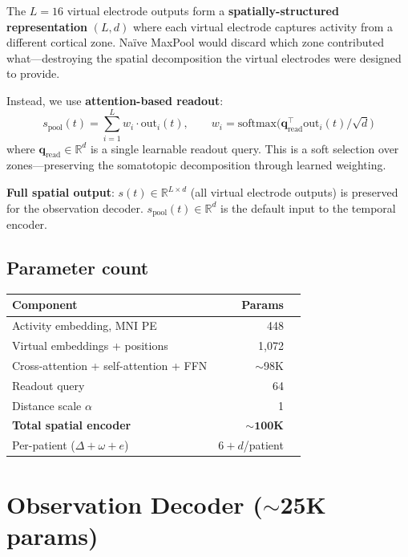 \documentclass[11pt,letterpaper]{article}
\newcommand{\R}{\mathbb{R}}
\begin{document}
The $L = 16$ virtual electrode outputs form a \textbf{spatially-structured representation} $(L, d)$ where each virtual electrode captures activity from a different cortical zone. Na\"ive MaxPool would discard which zone contributed what---destroying the spatial decomposition the virtual electrodes were designed to provide.

Instead, we use \textbf{attention-based readout}:
\begin{equation}
s_{\text{pool}}(t) = \sum_{i=1}^{L} w_i \cdot \text{out}_i(t), \qquad w_i = \text{softmax}\bigl(\mathbf{q}_{\text{read}}^\top \text{out}_i(t) / \sqrt{d}\bigr)
\end{equation}
where $\mathbf{q}_{\text{read}} \in \R^d$ is a single learnable readout query. This is a soft selection over zones---preserving the somatotopic decomposition through learned weighting.

\textbf{Full spatial output}: $s(t) \in \R^{L \times d}$ (all virtual electrode outputs) is preserved for the observation decoder. $s_{\text{pool}}(t) \in \R^d$ is the default input to the temporal encoder.

\subsection{Parameter count}

\begin{table}[ht!]\centering\small
\begin{tabular}{@{}lrl@{}}
\toprule
\textbf{Component} & \textbf{Params} \\
\midrule
Activity embedding, MNI PE & 448 \\
Virtual embeddings + positions & 1,072 \\
Cross-attention + self-attention + FFN & ${\sim}$98K \\
Readout query & 64 \\
Distance scale $\alpha$ & 1 \\
\midrule
\textbf{Total spatial encoder} & $\mathbf{{\sim}100}$\textbf{K} \\
Per-patient ($\Delta + \omega + e$) & $6 + d$/patient \\
\bottomrule
\end{tabular}
\end{table}


\section{Observation Decoder (\texorpdfstring{${\sim}$25K}{~25K} params)}\label{sec:obs-decoder}
\end{document}
